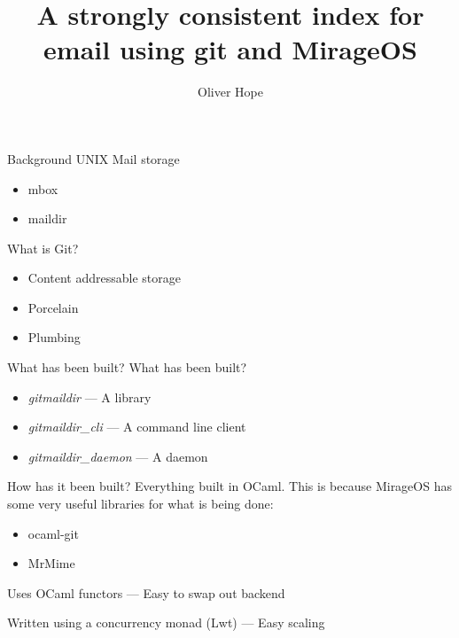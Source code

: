 \documentclass{beamer}
\title{A strongly consistent index for email using git and MirageOS}
\date{}
\author{Oliver Hope}
\institute{Jesus College}
\begin{document}
  \maketitle

  \begin{frame}[fragile]{Background}
    UNIX Mail storage

    \begin{itemize}
      \item mbox
      \item maildir
    \end{itemize}

    What is Git?

    \begin{itemize}
      \item Content addressable storage
      \item Porcelain
      \item Plumbing
    \end{itemize}
  \end{frame}

  \begin{frame}[fragile]{What has been built?}
    What has been built?

    \begin{itemize}
      \item \emph{gitmaildir} --- A library
      \item \emph{gitmaildir\_cli} --- A command line client
      \item \emph{gitmaildir\_daemon} --- A daemon
    \end{itemize}
  \end{frame}

  \begin{frame}{How has it been built?}
    Everything built in OCaml. This is because MirageOS has some very useful libraries for what is being done:

    \begin{itemize}
      \item ocaml-git
      \item MrMime
    \end{itemize}

    Uses OCaml functors --- Easy to swap out backend

    Written using a concurrency monad (Lwt) --- Easy scaling
  \end{frame}
\end{document}
